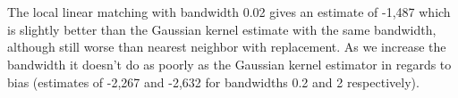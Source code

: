 \documentclass[11pt]{article}
\theoremstyle{definition}
\begin{document}
\section{}
The local linear matching with bandwidth 0.02 gives an estimate of -1,487 which is slightly better than the Gaussian kernel estimate with the same bandwidth, although still worse than nearest neighbor with replacement.  As we increase the bandwidth it doesn't do as poorly as the Gaussian kernel estimator in regards to bias (estimates of -2,267 and -2,632 for bandwidths 0.2 and 2 respectively).  
\end{document}

